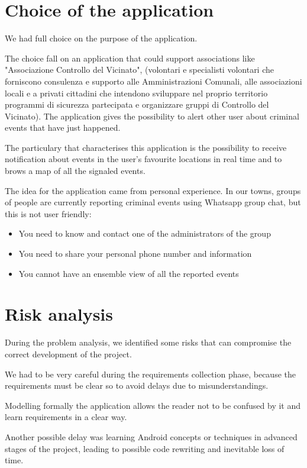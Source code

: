 \documentclass[a4paper]{scrreprt}
\begin{document}
\section{Choice of the application}
We had full choice on the purpose of the application.
\par The choice fall on an application that could support associations like "Associazione Controllo del Vicinato", (volontari e specialisti volontari che forniscono consulenza e supporto alle Amministrazioni Comunali, alle associazioni locali e a privati cittadini che intendono sviluppare nel proprio territorio programmi di sicurezza partecipata e organizzare gruppi di Controllo del Vicinato). The application gives the possibility to alert other user about criminal events that have just happened.
\par The particulary that characterises this application is the possibility to receive notification about events in the user's favourite locations in real time and to brows a map of all the signaled events.
\par The idea for the application came from personal experience. In our towns, groups of people are currently reporting criminal events using Whatsapp group chat, but this is not user friendly:
\begin{itemize}
\item You need to know and contact one of the administrators of the group
\item You need to share your personal phone number and information
\item You cannot have an ensemble view of all the reported events
\end{itemize}

\section{Risk analysis}
During the problem analysis, we identified some risks that can compromise the correct development of the project.
\par We had to be very careful during the requirements collection phase, because the requirements must be clear so to avoid delays due to misunderstandings.
\par Modelling formally the application allows the reader not to be confused by it and learn requirements in a clear way.
\par Another possible delay was learning Android concepts or techniques in advanced stages of the project, leading to possible code rewriting and inevitable loss of time.
\end{document}
